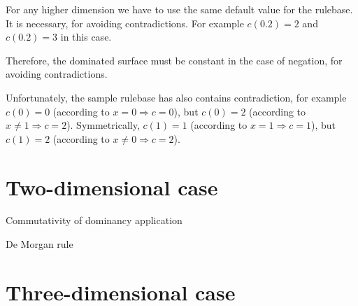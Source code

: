 \documentclass[a4paper,12pt]{article}
\begin{document}
For any higher dimension we have to use the same default value for the rulebase. It is necessary, for avoiding contradictions. For example $c(0.2) = 2$ and $c(0.2) = 3$ in this case.

Therefore, the dominated surface must be constant in the case of negation, for avoiding contradictions.

Unfortunately, the sample rulebase has also contains contradiction, for example $c(0) = 0$ (according to $x = 0 \Rightarrow c = 0$), but $c(0) = 2$ (according to $x \neq 1 \Rightarrow c = 2$). Symmetrically, $c(1) = 1$ (according to $x = 1 \Rightarrow c = 1$), but $c(1) = 2$ (according to $x \neq 0 \Rightarrow c = 2$).

\section{Two-dimensional case}

Commutativity of dominancy application

De Morgan rule

\section{Three-dimensional case}
\end{document}
